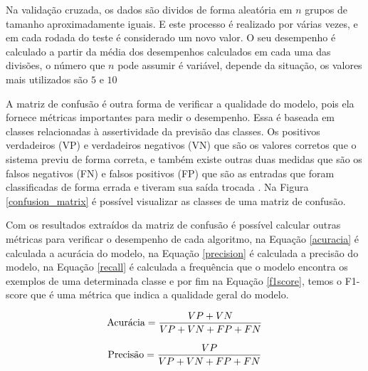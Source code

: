           Na validação cruzada, os dados são dividos de forma aleatória em $n$ grupos de tamanho aproximadamente iguais. E este processo 
          é realizado por várias vezes, e em cada rodada do teste é considerado um novo valor. O seu desempenho é calculado a partir da média
          dos desempenhos calculados em cada uma das divisões, o número que $n$ pode assumir é variável, depende da situação, os valores
          mais utilizados são $5$ e $10$\cite{kohavi1995study}


          A matriz de confusão é outra forma de verificar a qualidade do modelo, pois ela fornece métricas importantes 
          para medir o desempenho. Essa é baseada em classes relacionadas à assertividade da previsão das classes. Os positivos verdadeiros (VP) e verdadeiros negativos (VN)
          que são os valores corretos que o sistema previu de forma correta, e também existe outras duas medidas que são os falsos negativos (FN) e falsos positivos (FP) que são 
          as entradas que foram classificadas de forma errada e tiveram sua saída trocada \cite{martin}. Na Figura \ref{confusion_matrix} é possível visualizar
          as classes de uma matriz de confusão.




          Com os resultados extraídos da matriz de confusão é possível calcular outras métricas para verificar o desempenho de cada algoritmo, 
          na Equação \ref{acuracia} é calculada a acurácia do modelo, na Equação \ref{precision} é calculada a precisão do modelo, na Equação \ref{recall} é
          calculada a frequência que o modelo encontra os exemplos de uma determinada classe e por fim na Equação \ref{f1score}, temos o F1-score que é uma métrica
          que indica a qualidade geral do modelo.

          \begin{equation}\label{acuracia}
            \begin{aligned}
              \textup{Acurácia} = \frac{VP+VN}{VP+VN+FP+FN}
          \end{aligned} 
          \end{equation}

          \begin{equation}\label{precision}
            \begin{aligned}
              \textup{Precisão} = \frac{VP}{VP+VN+FP+FN}
          \end{aligned} 
          \end{equation}

